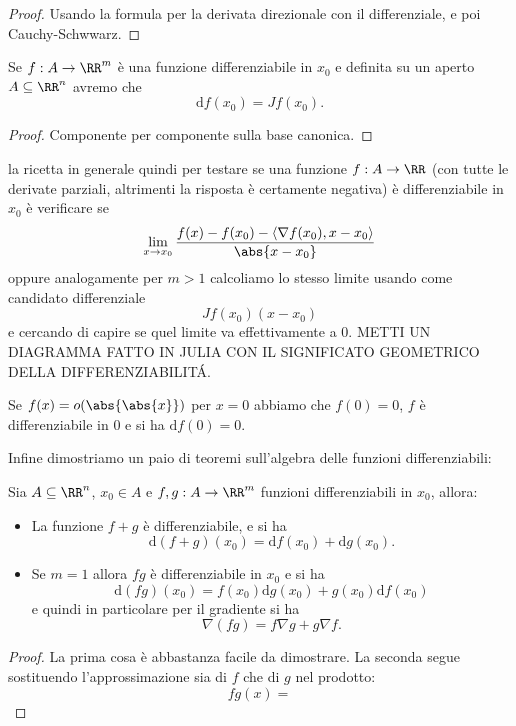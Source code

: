 \documentclass[11pt]{scrartcl}
\newcommand{\dif}{\text{d}}
\begin{document}
	\begin{proof}
		Usando la formula per la derivata direzionale con il differenziale, e poi Cauchy-Schwwarz.
	\end{proof}
	\begin{proposition}
		Se $f:A\to\RR^m$ è una funzione differenziabile in $x_0$ e definita su un aperto $A\subseteq \RR^n$ avremo che
		$$\dif f (x_0)=Jf(x_0).$$ 
	\end{proposition}
	\begin{proof}
		Componente per componente sulla base canonica.
	\end{proof}
	la ricetta in generale quindi per testare se una funzione $f:A \to\RR$ (con tutte le derivate parziali, altrimenti la risposta è certamente negativa) è differenziabile in $x_0$ è verificare se 
	$$\lim_{x\to x_0}\frac{f(x)-f(x_0)-\langle \nabla f(x_0),x-x_0\rangle}{\abs{x-x_0}}$$
	oppure analogamente per $m>1$ calcoliamo lo stesso limite usando come candidato differenziale
	$$Jf(x_0)(x-x_0)$$
	e cercando di capire se quel limite va effettivamente a $0$. METTI UN DIAGRAMMA FATTO IN JULIA CON IL SIGNIFICATO GEOMETRICO DELLA DIFFERENZIABILIT\'A.
	\begin{proposition}
		Se $f(x)=o(\abs{\abs{x}})$ per $x=0$ abbiamo che $f(0)=0$, $f$ è differenziabile in $0$ e si ha $\dif f(0)=0$.
	\end{proposition}
	Infine dimostriamo un paio di teoremi sull'algebra delle funzioni differenziabili:
	\begin{proposition}
		Sia $A\subseteq \RR^n$, $x_0\in A$ e $f,g:A\to\RR^m$ funzioni differenziabili in $x_0$, allora:
		\begin{itemize}
			\item La funzione $f+g$ è differenziabile, e si ha
			$$\dif \left(f+g\right)(x_0)=\dif f(x_0) + \dif g(x_0).$$
			\item Se $m=1$ allora $fg$ è differenziabile in $x_0$ e si ha
			$$\dif \left(fg\right)(x_0)=f(x_0)\dif g(x_0)+g(x_0)\dif f(x_0)$$
			e quindi in particolare per il gradiente si ha
			$$\nabla \left(fg\right)=f\nabla g + g \nabla f.$$
		\end{itemize}
	\end{proposition}
	\begin{proof}
		La prima cosa è abbastanza facile da dimostrare. La seconda segue sostituendo l'approssimazione sia di $f$ che di $g$ nel prodotto:
		$$fg(x)=$$
	\end{proof}
\end{document}
